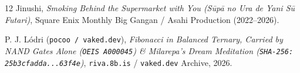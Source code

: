 \documentclass[10pt, twocolumn, a4paper]{article}
\begin{document}
\begin{thebibliography}{12}
Jinushi, \textit{Smoking Behind the Supermarket with You (S\=up\=a no Ura de Yani S\=u Futari)}, Square Enix Monthly Big Gangan / Asahi Production (2022--2026).

P. J. Lódri (\texttt{pocoo / vaked.dev}), \textit{Fibonacci in Balanced Ternary, Carried by NAND Gates Alone (\texttt{OEIS A000045}) \& Milarepa's Dream Meditation (\texttt{SHA-256: 25b3cfadda...63f4e})}, \texttt{riva.8b.is} / \texttt{vaked.dev} Archive, 2026.

\end{thebibliography}
\end{document}
